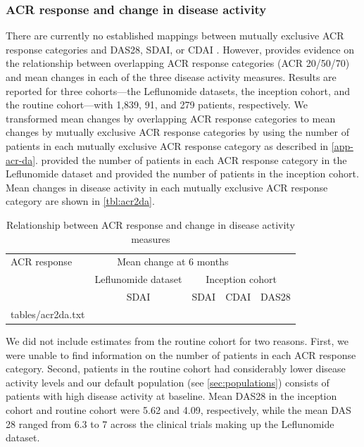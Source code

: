 \documentclass[11pt,final,fleqn]{article}\usepackage[]{graphicx}\usepackage[]{color}
\makeatletter
\theoremstyle{plain}
\newcommand*\ExpandableInput[1]{\@@input#1 }
\makeatother
\begin{document}
\subsubsection{ACR response and change in disease activity}
There are currently no established mappings between mutually exclusive ACR response categories and DAS28, SDAI, or CDAI \citep{madan2015consensus}. However, \citet{aletaha2005simplified} provides evidence on the relationship between overlapping ACR response categories (ACR 20/50/70) and mean changes in each of the three disease activity measures. Results are reported for three cohorts---the Leflunomide datasets, the inception cohort, and the routine cohort---with 1,839, 91, and 279 patients, respectively. We transformed mean changes by overlapping ACR response categories to mean changes by mutually exclusive ACR response categories by using the number of patients in each mutually exclusive ACR response category as described in \autoref{app-acr-da}. \citet{smolen2003simplified} provided the number of patients in each ACR response category in the Leflunomide dataset and \citet{aletaha2005acute} provided the number of patients in the inception cohort. Mean changes in disease activity in each mutually exclusive ACR response category are shown in \autoref{tbl:acr2da}.



\begin{table}[!ht]
\begin{center}
\begin{threeparttable}
\caption{Relationship between ACR response and change in disease activity measures} \label{tbl:acr2da}
\begin{tabularx}{\textwidth}{@{\extracolsep{\fill}}lcccc}
\hline
\multicolumn{1}{l}{ACR response} &  \multicolumn{3}{c}{Mean change at 6 months}\\
\cmidrule{2-5}
\multicolumn{1}{l}{} & \multicolumn{1}{c}{Leflunomide dataset} & \multicolumn{3}{c}{Inception cohort}\\
\cmidrule(lr){2-2}  \cmidrule(lr){3-5}
\multicolumn{1}{c}{} & \multicolumn{1}{c}{SDAI} & \multicolumn{1}{c}{SDAI} &\multicolumn{1}{c}{CDAI} & \multicolumn{1}{c}{DAS28} \\
\hline
\ExpandableInput{tables/acr2da.txt}
\hline
\end{tabularx}
\scriptsize
\end{threeparttable}
\end{center}
\end{table}

We did not include estimates from the routine cohort for two reasons. First, we were unable to find information on the number of patients in each ACR response category. Second, patients in the routine cohort had considerably lower disease activity levels \citep{aletaha2005simplified, aletaha2005acute} and our default population (see \autoref{sec:populations}) consists of patients with high disease activity at baseline. Mean DAS28 in the inception cohort and routine cohort were 5.62 and 4.09, respectively, while the mean DAS 28 ranged from 6.3 to 7 across the clinical trials making up the Leflunomide dataset.
\end{document}
